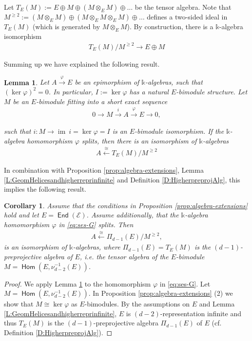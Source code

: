\documentclass[a4paper,11pt, reqno]{amsart}
\def\sE{\mathscr{E}}
\def\im{{\operatorname{im}}}
\newcommand{\opname}[1]{\operatorname{\mathsf{#1}}}
\newcommand{\Hom}{\opname{Hom}}
\newcommand{\End}{\opname{End}}
\theoremstyle{plain}
\newtheorem{lemma}[dummy]{Lemma}
\newtheorem{corollary}[dummy]{Corollary}
\theoremstyle{definition}
\numberwithin{equation}{section}
\newlength{\arrow}
\begin{document}
Let $T_E(M):=E \oplus M \oplus (M \otimes_E M) \oplus \ldots $ be the tensor algebra. Note that $M^{\geq 2}:=(M \otimes_E M) \oplus (M \otimes_E M \otimes_E M) \oplus \ldots$ defines a two-sided ideal in $T_E(M)$ (which is generated by $M \otimes_E M$).
By construction, there is a  $\mathbb k$-algebra isomorphism 
\begin{align}
    T_E(M)/M^{\geq 2} \to E \oplus M
\end{align}

Summing up we have explained the following result.

\begin{lemma}\label{L:Quotient-Tensor-Alg}
    Let $A \xrightarrow{\varphi} E$ be an epimorphism of $\mathbb k$-algebras, such that $(\ker \varphi)^2=0$. In particular, $I:=\ker \varphi$ has a natural $E$-bimodule structure.
    Let $M$ be an $E$-bimodule fitting into a short exact sequence
    \begin{align}
    0 \to M \xrightarrow{i} A \xrightarrow{\varphi} E \to 0,
\end{align}

such that $i\colon M \to \im \ i = \ker \varphi =I$ is an $E$-bimodule isomorphism. If the $\mathbb k$-algebra homomorphism $\varphi$ splits, then there is an isomorphism of $\mathbb k$-algebras
\begin{align}
    A \xleftarrow{\cong} T_E(M)/M^{\geq 2}
\end{align}
\end{lemma}

In combination with Proposition \ref{prop:algebra-extensions}, Lemma \ref{L:GeomHelicesandhigherreprinfinite} and Definition \ref{D:HigherpreprojAlg}, this implies the following result.

\begin{corollary}\label{C:QuotientPreproj}
    Assume that the conditions in Proposition \ref{prop:algebra-extensions} hold and let $E=\End(\sE)$. Assume additionally, that the $\mathbb k$-algebra homomorphism $\varphi$ in \eqref{eq:ses-G} splits.
    Then  
    \begin{align}\label{E:TensorModSquare}
    A \xleftarrow{\cong} \Pi_{d-1}(E)/M^{\geq 2},
\end{align}
is an isomorphism of $\mathbb k$-algebras,
where $\Pi_{d-1}(E)=T_E(M)$ is the $(d-1)$-preprojective algebra of $E$, i.e. the tensor algebra of the $E$-bimodule $M=\Hom(E, \nu_{d-2}^{-1}(E))$.
\end{corollary}
\begin{proof}
We apply Lemma \ref{L:Quotient-Tensor-Alg} to the homomorphism $\varphi$ in \eqref{eq:ses-G}. 
 Let $M=\Hom(E, \nu_{d-2}^{-1}(E))$. In  Proposition \ref{prop:algebra-extensions} (2) we show that 
$M \cong \ker \varphi$ as $E$-bimodules. By the assumptions on $E$ and Lemma \ref{L:GeomHelicesandhigherreprinfinite}, $E$ is $(d-2)$-representation infinite and thus $T_E(M)$ is the $(d-1)$-preprojective algebra $\Pi_{d-1}(E)$ of $E$ (cf. Definition \ref{D:HigherpreprojAlg}). 
\end{proof}
\end{document}
